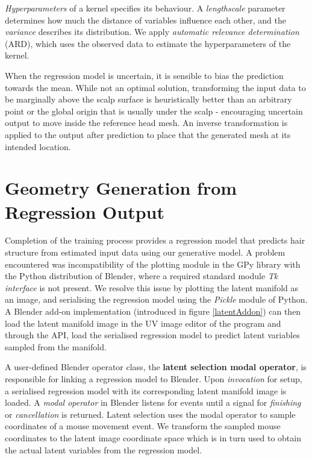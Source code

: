 \documentclass[ %
author={Dillon Keith Diep},
supervisor={Dr. Carl Henrik Ek},
degree={MEng},
title={ART-CG Hair:},
subtitle={Assisted Real-time Content Generation of Stylised Virtual Hair},
type={Research},
year={2017} ]{dissertation}
\begin{document}
\textit{Hyperparameters} of a kernel specifies its behaviour. A \textit{lengthscale} parameter determines how much the distance of variables influence each other, and the \textit{variance} describes its distribution. We apply \textit{automatic relevance determination} (ARD), which uses the observed data to estimate the hyperparameters of the kernel.

When the regression model is uncertain, it is sensible to bias the prediction towards the mean. While not an optimal solution, transforming the input data to be marginally above the scalp surface is heuristically better than an arbitrary point or the global origin that is usually under the scalp - encouraging uncertain output to move inside the reference head mesh. An inverse transformation is applied to the output after prediction to place that the generated mesh at its intended location. 

\section{Geometry Generation from Regression Output}
Completion of the training process provides a regression model that predicts hair structure from estimated input data using our generative model. A problem encountered was incompatibility of the plotting module in the GPy library with the Python distribution of Blender, where a required standard module \textit{Tk interface} is not present. We resolve this issue by plotting the latent manifold as an image, and serialising the regression model using the \textit{Pickle} module of Python. A Blender add-on implementation (introduced in figure \ref{latentAddon}) can then load the latent manifold image in the UV image editor of the program and through the API, load the serialised regression model to predict latent variables sampled from the manifold.

A user-defined Blender operator class, the \textbf{latent selection modal operator}, is responsible for linking a regression model to Blender. Upon \textit{invocation} for setup, a serialised regression model with its corresponding latent manifold image is loaded. A \textit{modal operator} in Blender listens for events until a signal for \textit{finishing} or \textit{cancellation} is returned. Latent selection uses the modal operator to sample coordinates of a mouse movement event. We transform the sampled mouse coordinates to the latent image coordinate space which is in turn used to obtain the actual latent variables from the regression model. 
\end{document}
